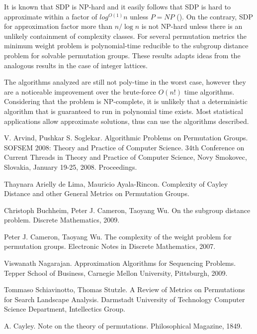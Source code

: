 \documentclass[12pt]{report}
\begin{document}
It is known that SDP is NP-hard and it easily follows that SDP is hard to approximate within a factor of $log^{O(1)} n$ unless $P=NP$ (\cite{Arvind}). On the contrary, SDP for approximation factor more than $n / \log n$ is not NP-hard unless there is an unlikely containment of complexity classes. For several permutation metrics the minimum weight problem is polynomial-time reducible to the subgroup distance problem for solvable permutation groups. These results adapts ideas from the analogous results in the case of integer lattices.

The algorithms analyzed are still not poly-time in the worst case, however they are a noticeable improvement over the brute-force $O(n!)$ time algorithms. Considering that the problem is NP-complete, it is unlikely that a deterministic algorithm that is guaranteed to run in polynomial time exists. Most statistical applications allow approximate solutions, thus can use the algorithms described.

\newpage


\begin{thebibliography}{30}

 V. Arvind, Pushkar S. Soglekar. Algorithmic Problems on Permutation Groups. SOFSEM 2008: Theory and Practice of Computer Science. 34th Conference  on Current Threads in Theory and Practice of Computer Science, Novy Smokovec, Slovakia, January 19-25, 2008. Proceedings.

 Thaynara Arielly de Lima, Mauricio Ayala-Rincon. Complexity of Cayley Distance and other General Metrics on Permutation Groups.

 Christoph Buchheim, Peter J. Cameron, Taoyang Wu. On the subgroup distance problem. Discrete Mathematics, 2009.

 Peter J. Cameron, Taoyang Wu. The complexity of the weight problem for permutation groups. Electronic Notes in Discrete Mathematics, 2007.

 Viswanath Nagarajan. Approximation Algorithms for Sequencing Problems. Tepper School of Business, Carnegie Mellon University, Pittsburgh, 2009.

 Tommaso Schiavinotto, Thomas Stutzle. A Review of Metrics on Permutations for Search Landscape Analysis. Darmstadt University of Technology Computer Science Department, Intellectics Group.

 A. Cayley. Note on the theory of permutations. Philosophical Magazine, 1849.
\end{thebibliography}
\end{document}
